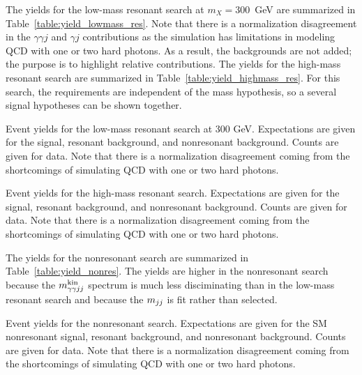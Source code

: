 The yields for the low-mass resonant search at $m_X = 300$~GeV are summarized in
Table~\ref{table:yield_lowmass_res}. Note that there is a normalization disagreement in the
$\gamma\gamma j$ and $\gamma j$ contributions as the simulation has limitations in modeling
QCD with one or two hard photons. As a result, the backgrounds are not added; the purpose is to
highlight relative contributions. The yields for the high-mass resonant search are summarized in
Table~\ref{table:yield_highmass_res}. For this search, the requirements are independent of
the mass hypothesis, so a several signal hypotheses can be shown together.

\begin{table}[ht]
  \centering
  \renewcommand{\arraystretch}{1.4}
  \caption{Event yields for the low-mass resonant search at 300 GeV. Expectations are given for
the signal, resonant background, and nonresonant background. Counts are given for data. Note that
there is a normalization disagreement coming from the shortcomings of simulating QCD with one
or two hard photons.}
  
  \label{table:yield_lowmass_res}
\end{table}

\begin{table}[ht]
  \centering
  \renewcommand{\arraystretch}{1.4}
  \caption{Event yields for the high-mass resonant search. Expectations are given for
the signal, resonant background, and nonresonant background. Counts are given for data. Note that
there is a normalization disagreement coming from the shortcomings of simulating QCD with one
or two hard photons.}
  
  \label{table:yield_highmass_res}
\end{table}

The yields for the nonresonant search are summarized in Table~\ref{table:yield_nonres}.
The yields are higher in the nonresonant search because the $m_{\gamma\gamma jj}^{\rm kin}$ spectrum is much less
disciminating than in the low-mass resonant search and because the $m_{jj}$ is fit rather than
selected.

\begin{table}[ht]
  \centering
  \renewcommand{\arraystretch}{1.4}
  \caption{Event yields for the nonresonant search. Expectations are given for
the SM nonresonant signal, resonant background, and nonresonant background.
Counts are given for data. Note that
there is a normalization disagreement coming from the shortcomings of simulating QCD with one
or two hard photons.}
  
  \label{table:yield_nonres}
\end{table}

